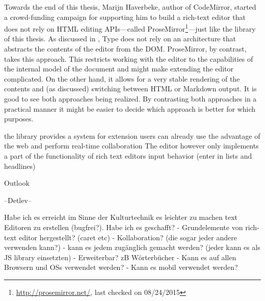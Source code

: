 Towards the end of this thesis, Marijn Haverbeke, author of CodeMirror, started a crowd-funding campaign for supporting him to build a rich-text editor that does not rely on HTML editing APIs---called ProseMirror\footnote{\url{http://prosemirror.net/}, last checked on 08/24/2015}---just like the library of this thesis. As discussed in , Type does not rely on an architecture that abstracts the contents of the editor from the DOM. ProseMirror, by contrast, takes this approach. This restricts working with the editor to the capabilities of the internal model of the document and might make extending the editor complicated. On the other hand, it allows for a very stable rendering of the contents and (as discussed) switching between HTML or Markdown output. It is good to see both approaches being realized. By contrasting both approaches in a practical manner it might be easier to decide which approach is better for which purposes.



\iffalse



the library provides a system for extension
users can already use the advantage of the web and perform real-time collaboration
The editor however only implements a part of the functionality of rich text editors
input behavior (enter in lists and headlines)

Outlook

--Detlev--

Habe ich es erreicht im Sinne der Kulturtechnik es leichter zu machen text Editoren zu erstellen (bugfrei?).
Habe ich es geschafft?
 - Grundelemente von rich-text editor hergestellt? (caret etc)
 - Kollaboration? (die sogar jeder andere verwenden kann?)
 - kann es jedem zugänglich gemacht werden? (jeder kann es als JS library einsetzten)
 - Erweiterbar? zB Wörterbücher
 - Kann es auf allen Browsern und OSs verwendet werden?
 - Kann es mobil verwendet werden?




